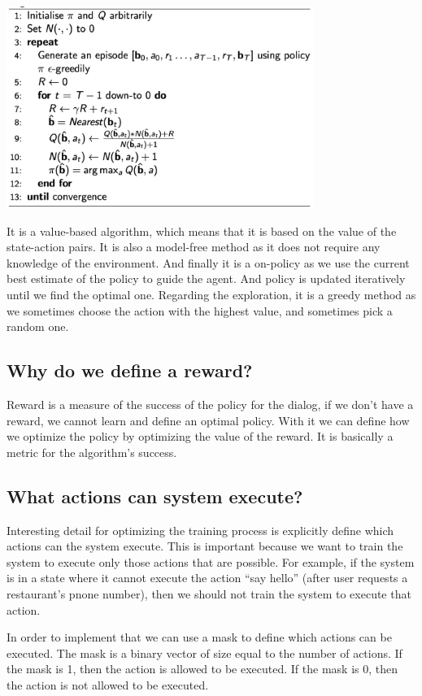 \documentclass[12pt,titlepage,a4paper]{article}
\begin{document}
\begin{center}
    \includegraphics[width=10cm]{MCC.png}
\end{center}
It is a value-based algorithm, which means that it is based on the value of the state-action pairs. It is also a model-free method as it does not require any knowledge of the environment. And finally it is a on-policy as we use the current best estimate of the policy to guide the agent. And policy is updated iteratively until we find the optimal one. Regarding the exploration, it is a greedy method as we sometimes choose the action with the highest value, and sometimes pick a random one.

\subsection{Why do we define a reward?}

Reward is a measure of the success of the policy for the dialog, if we don’t have a reward, we cannot learn and define an optimal policy. With it we can define how we optimize the policy by optimizing the value of the reward. It is basically a metric for the algorithm's success.

\subsection{What actions can system execute?}

Interesting detail for optimizing the training process is explicitly define which actions can the system execute. This is important because we want to train the system to execute only those actions that are possible. For example, if the system is in a state where it cannot execute the action “say hello” (after user requests a restaurant's pnone number), then we should not train the system to execute that action. 

In order to implement that we can use a mask to define which actions can be executed. The mask is a binary vector of size equal to the number of actions. If the mask is 1, then the action is allowed to be executed. If the mask is 0, then the action is not allowed to be executed.
\end{document}
